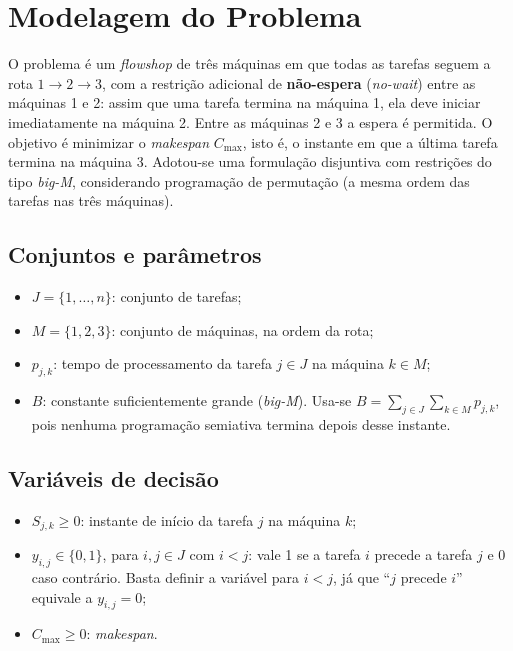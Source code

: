 \section{Modelagem do Problema}

O problema é um \textit{flowshop} de três máquinas em que todas as tarefas
seguem a rota $1 \rightarrow 2 \rightarrow 3$, com a restrição adicional de
\textbf{não-espera} (\textit{no-wait}) entre as máquinas 1 e 2: assim que uma
tarefa termina na máquina 1, ela deve iniciar imediatamente na máquina 2. Entre
as máquinas 2 e 3 a espera é permitida. O objetivo é minimizar o
\textit{makespan} $C_{\max}$, isto é, o instante em que a última tarefa termina
na máquina 3. Adotou-se uma formulação disjuntiva com restrições do tipo
\textit{big-M}, considerando programação de permutação (a mesma ordem das
tarefas nas três máquinas).

\subsection{Conjuntos e parâmetros}
\begin{itemize}
  \item $J = \{1, \dots, n\}$: conjunto de tarefas;
  \item $M = \{1, 2, 3\}$: conjunto de máquinas, na ordem da rota;
  \item $p_{j,k}$: tempo de processamento da tarefa $j \in J$ na máquina $k \in M$;
  \item $B$: constante suficientemente grande (\textit{big-M}). Usa-se
        $B = \sum_{j \in J}\sum_{k \in M} p_{j,k}$, pois nenhuma programação
        semiativa termina depois desse instante.
\end{itemize}

\subsection{Variáveis de decisão}
\begin{itemize}
  \item $S_{j,k} \geq 0$: instante de início da tarefa $j$ na máquina $k$;
  \item $y_{i,j} \in \{0,1\}$, para $i,j \in J$ com $i<j$: vale 1 se a tarefa
        $i$ precede a tarefa $j$ e 0 caso contrário. Basta definir a variável
        para $i<j$, já que ``$j$ precede $i$'' equivale a $y_{i,j}=0$;
  \item $C_{\max} \geq 0$: \textit{makespan}.
\end{itemize}

